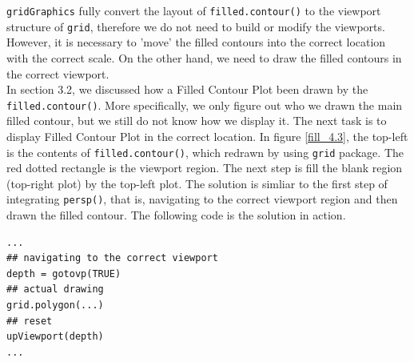\documentclass[paper=a4, fontsize=11pt]{report}
\begin{document}
\texttt{gridGraphics} fully convert the layout of \texttt{filled.contour()} to the viewport structure of \texttt{grid}, therefore we do not need to build or modify the viewports. However, it is necessary to 'move' the filled contours into the correct location with the correct scale. On the other hand, we need to draw the filled contours in the correct viewport.\\

In section 3.2, we discussed how a Filled Contour Plot been drawn by the \texttt{filled.contour()}. More specifically, we only figure out who we drawn the main filled contour, but we still do not know how we display it. The next task is to display Filled Contour Plot in the correct location. In figure \ref{fill_4.3}, the top-left is the contents of \texttt{filled.contour()}, which redrawn by using \texttt{grid} package. The red dotted rectangle is the viewport region. The next step is fill the blank region (top-right plot) by the top-left plot. The solution is simliar to the first step of integrating \texttt{persp()}, that is, navigating to the correct viewport region and then drawn the filled contour. The following code is the solution in action.

\begin{lstlisting}
...
## navigating to the correct viewport
depth = gotovp(TRUE)
## actual drawing
grid.polygon(...)
## reset
upViewport(depth)
...
\end{lstlisting}
\end{document}
